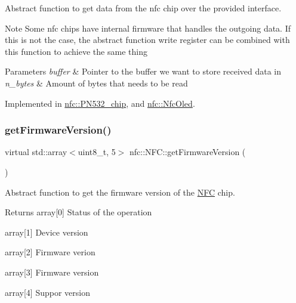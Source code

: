 Abstract function to get data from the nfc chip over the provided interface. 

\begin{DoxyNote}{Note}
Some nfc chips have internal firmware that handles the outgoing data. If this is not the case, the abstract function write register can be combined with this function to achieve the same thing 
\end{DoxyNote}

\begin{DoxyParams}{Parameters}
{\em buffer} & Pointer to the buffer we want to store received data in \\
\hline
{\em n\+\_\+bytes} & Amount of bytes that needs to be read \\
\hline
\end{DoxyParams}


Implemented in \hyperlink{classnfc_1_1PN532__chip_ae8414552a504fec6b62ad0be140e53e0}{nfc\+::\+P\+N532\+\_\+chip}, and \hyperlink{classnfc_1_1NfcOled_a4f9564fbbc2981031fbfbf50be308745}{nfc\+::\+Nfc\+Oled}.

\mbox{\label{classnfc_1_1NFC_a25a4f9824ac567c8ca37ea3486d32882}} 
\subsubsection{\texorpdfstring{get\+Firmware\+Version()}{getFirmwareVersion()}}
{\footnotesize\ttfamily virtual std\+::array$<$uint8\+\_\+t, 5$>$ nfc\+::\+N\+F\+C\+::get\+Firmware\+Version (\begin{DoxyParamCaption}{ }\end{DoxyParamCaption})\hspace{0.3cm}{\ttfamily [pure virtual]}}



Abstract function to get the firmware version of the \hyperlink{classnfc_1_1NFC}{N\+FC} chip. 

\begin{DoxyReturn}{Returns}
array\mbox{[}0\mbox{]} Status of the operation 

array\mbox{[}1\mbox{]} Device version 

array\mbox{[}2\mbox{]} Firmware verion 

array\mbox{[}3\mbox{]} Firmware version 

array\mbox{[}4\mbox{]} Suppor version 
\end{DoxyReturn}


